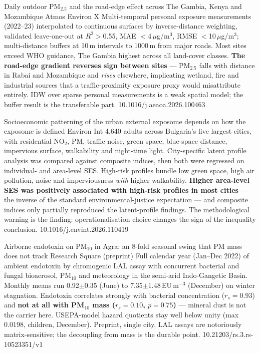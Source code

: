 \documentclass[10pt]{article}
\begin{document}
{Daily outdoor PM$_{2.5}$ and the road-edge effect across The Gambia, Kenya and Mozambique}
{Atmos Environ X}
{Multi-temporal personal exposure measurements (2022--23) interpolated to continuous
surfaces by inverse-distance weighting, validated leave-one-out at $R^2>$0.55, MAE
$<$4\,$\mu$g/m$^3$, RMSE $<$10\,$\mu$g/m$^3$; multi-distance buffers at 10\,m intervals to
1000\,m from major roads. Most sites exceed WHO guidance, The Gambia highest across all
land-cover classes. \textbf{The road-edge gradient reverses sign between sites} ---
PM$_{2.5}$ falls with distance in Rabai and Mozambique and \emph{rises} elsewhere,
implicating wetland, fire and industrial sources that a traffic-proximity exposure proxy
would misattribute entirely. IDW over sparse personal measurements is a weak spatial
model; the buffer result is the transferable part.}
{10.1016/j.aeaoa.2026.100463}

{Socioeconomic patterning of the urban external exposome depends on how the exposome is defined}
{Environ Int}
{4{,}640 adults across Bulgaria's five largest cities, with residential NO$_2$, PM, traffic
noise, green space, blue-space distance, impervious surface, walkability and night-time
light. City-specific latent profile analysis was compared against composite indices, then
both were regressed on individual- and area-level SES. High-risk profiles bundle low
green space, high air pollution, noise and imperviousness \emph{with} higher walkability.
\textbf{Higher area-level SES was positively associated with high-risk profiles in most
cities} --- the inverse of the standard environmental-justice expectation --- and composite
indices only partially reproduced the latent-profile findings. The methodological warning
is the finding: operationalisation choice changes the sign of the inequality conclusion.}
{10.1016/j.envint.2026.110419}

{Airborne endotoxin on PM$_{10}$ in Agra: an 8-fold seasonal swing that PM mass does not track}
{Research Square (preprint)}
{Full calendar year (Jan--Dec 2022) of ambient endotoxin by chromogenic LAL assay with
concurrent bacterial and fungal bioaerosol, PM$_{10}$ and meteorology in the semi-arid
Indo-Gangetic Basin. Monthly means run 0.92$\pm$0.35 (June) to 7.35$\pm$1.48\,EU\,m$^{-3}$
(December) on winter stagnation. Endotoxin correlates strongly with bacterial
concentration ($r_s=0.93$) and \textbf{not at all with PM$_{10}$ mass ($r_s=0.10$,
$p=0.75$)} --- mineral dust is not the carrier here. USEPA-model hazard quotients stay
well below unity (max 0.0198, children, December). Preprint, single city, LAL assays are
notoriously matrix-sensitive; the decoupling from mass is the durable point.}
{10.21203/rs.3.rs-10523351/v1}
\end{document}
